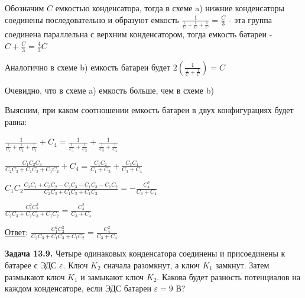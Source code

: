 \documentclass[12pt]{article}
\begin{document}
Обозначим $C$ емкостью конденсатора, тогда в схеме a) нижние конденсаторы 
соединены последовательно и образуют емкость $\frac{1}{\frac{1}{C} + \frac{1}{C} + \frac{1}{C}} = \frac{C}{3}$ - 
эта группа соединена параллельна с верхним конденсатором, тогда емкость батареи - $C + \frac{C}{3} = \frac{4}{3}C$

Аналогично в схеме b) емкость батареи будет $2\left(\frac{1}{\frac{1}{C} + \frac{1}{C}}\right) = C$

Очевидно, что в схеме a) емкость больше, чем в схеме b)

\mediumvspace

Выясним, при каком соотношении емкость батареи в двух конфигурациях будет равна:

$\frac{1}{\frac{1}{C_1} + \frac{1}{C_2} + \frac{1}{C_3}} + C_4 = \frac{1}{\frac{1}{C_1} + \frac{1}{C_2}} + \frac{1}{\frac{1}{C_3} + \frac{1}{C_4}}$

$\frac{C_1 C_2 C_3}{C_2 C_3 + C_1 C_3 + C_1 C_2} + C_4 = \frac{C_1 C_2}{C_1 + C_2} + \frac{C_3 C_4}{C_3 + C_4}$

$C_1 C_2 \frac{C_3 C_1 + C_3 C_2 - C_2 C_3 - C_1 C_3 - C_1 C_2}{C_2 C_3 + C_1 C_3 + C_1 C_2} = -\frac{C^2_4}{C_3 + C_4}$

$\frac{C^2_1 C^2_2}{C_2 C_3 + C_1 C_3 + C_1 C_2} = \frac{C^2_4}{C_3 + C_4}$


\bigvspace

\underline{Ответ}: $\frac{C^2_1 C^2_2}{C_2 C_3 + C_1 C_3 + C_1 C_2} = \frac{C^2_4}{C_3 + C_4}$

\begin{tcolorbox}
    \textbf{Задача 13.9.} Четыре одинаковых конденсатора 
    соединены и присоединены к батарее с ЭДС $\varepsilon$.
    Ключ $K_2$ сначала разомкнут, а ключ $K_1$ замкнут. 
    Затем размыкают ключ $K_1$ и замыкают
    ключ $K_2$. Какова будет разность потенциалов
    на каждом конденсаторе, если ЭДС батареи
    $\varepsilon = 9$ В?
\end{tcolorbox}
\end{document}
